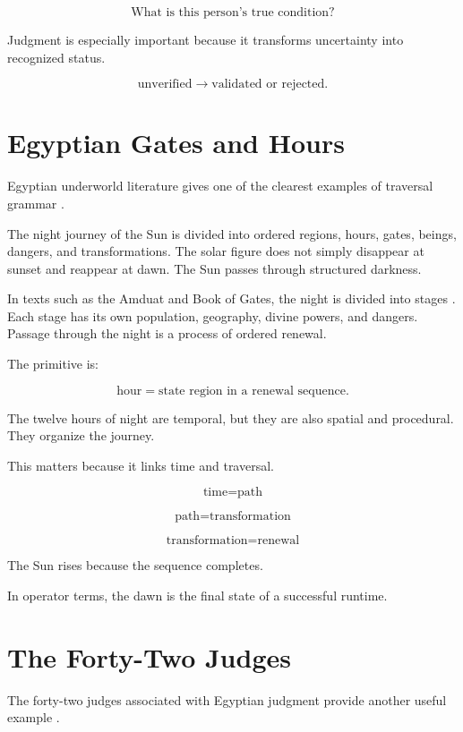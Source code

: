 \documentclass[11pt]{book}
\begin{document}
\[
\text{What is this person's true condition?}
\]

Judgment is especially important because it transforms uncertainty into recognized status.

\[
\text{unverified} \rightarrow \text{validated or rejected}.
\]

\section{Egyptian Gates and Hours}

Egyptian underworld literature gives one of the clearest examples of traversal grammar \cite{Hornung1999BooksAfterlife,Hornung1990BookGates,Assmann2005DeathSalvation}.

The night journey of the Sun is divided into ordered regions, hours, gates, beings, dangers, and transformations. The solar figure does not simply disappear at sunset and reappear at dawn. The Sun passes through structured darkness.

In texts such as the Amduat and Book of Gates, the night is divided into stages \cite{Hornung1999BooksAfterlife,Hornung1990BookGates}. Each stage has its own population, geography, divine powers, and dangers. Passage through the night is a process of ordered renewal.

The primitive is:

\[
\text{hour} = \text{state region in a renewal sequence}.
\]

The twelve hours of night are temporal, but they are also spatial and procedural. They organize the journey.

This matters because it links time and traversal.

\[
\text{time} = \text{path}
\]

\[
\text{path} = \text{transformation}
\]

\[
\text{transformation} = \text{renewal}
\]

The Sun rises because the sequence completes.

In operator terms, the dawn is the final state of a successful runtime.

\section{The Forty-Two Judges}

The forty-two judges associated with Egyptian judgment provide another useful example \cite{Allen1974BookDead,Faulkner1972BookDead,Assmann2005DeathSalvation}.
\end{document}
